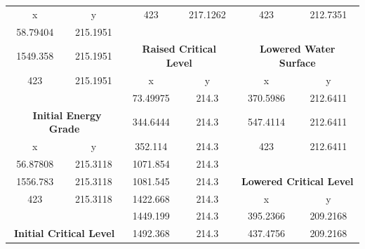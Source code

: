 \begin{center}
\begin{tabular}{|cc|cc|cc|}
    \cline{1-2}
    x        & y                                             & 423      & 217.1262                                  & 423      & 212.7351                                        \\
    58.79404 & 215.1951                                      &          &                                           &          &                                                 \\
    1549.358 & 215.1951                                      & \multicolumn{2}{c|}{\textbf{Raised Critical Level }} & \multicolumn{2}{c|}{\textbf{Lowered Water Surface }}       \\ 
    \cline{3-6}
    423      & 215.1951                                      & x        & y                                         & x        & y                                               \\
             &                                               & 73.49975 & 214.3                                     & 370.5986 & 212.6411                                        \\
    \multicolumn{2}{|c|}{\textbf{~Initial Energy Grade }}    & 344.6444 & 214.3                                     & 547.4114 & 212.6411                                        \\ 
    \cline{1-2}
    x        & y                                             & 352.114  & 214.3                                     & 423      & 212.6411                                        \\
    56.87808 & 215.3118                                      & 1071.854 & 214.3                                     &          &                                                 \\
    1556.783 & 215.3118                                      & 1081.545 & 214.3                                     & \multicolumn{2}{c|}{\textbf{Lowered Critical Level }}      \\ 
    \cline{5-6}
    423      & 215.3118                                      & 1422.668 & 214.3                                     & x        & y                                               \\
             &                                               & 1449.199 & 214.3                                     & 395.2366 & 209.2168                                        \\
    \multicolumn{2}{|c|}{\textbf{Initial Critical Level }}   & 1492.368 & 214.3                                     & 437.4756 & 209.2168                                        \\ 

\end{tabular}
\end{center}
